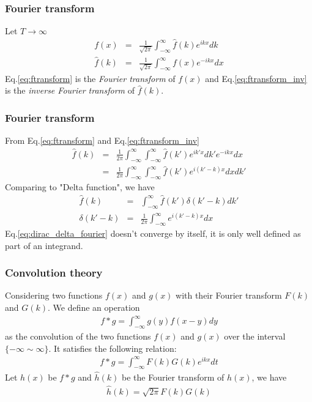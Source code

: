\documentclass{beamer}
\begin{document}
\begin{frame}
\frametitle{Fourier transform}
Let $T\longrightarrow\infty$
\begin{eqnarray}
f(x)&=&\frac{1}{\sqrt{2\pi}}\int_{-\infty}^{\infty} \hat{f}(k) e^{ikx} dk
\label{eq:ftransform_inv}\\
\hat{f}(k)&=&\frac{1}{\sqrt{2\pi}}\int_{-\infty}^{\infty} f(x) e^{-ikx} dx
\label{eq:ftransform}
\end{eqnarray}
Eq.\ref{eq:ftransform} is the \emph{Fourier transform} of $f(x)$ and Eq.\ref{eq:ftransform_inv} is the \emph{inverse Fourier transform} of $\hat{f}(k)$.
\end{frame}
\begin{frame}
\frametitle{Fourier transform}
From Eq.\ref{eq:ftransform} and Eq.\ref{eq:ftransform_inv}
\begin{eqnarray}
\hat{f}(k)&=&\frac{1}{2\pi}\int_{-\infty}^{\infty} \int_{-\infty}^{\infty} \hat{f}(k') e^{ik'x} dk' e^{-ikx} dx \nonumber \\
          &=&\frac{1}{2\pi}\int_{-\infty}^{\infty} \int_{-\infty}^{\infty} \hat{f}(k') e^{i(k'-k)x} dx dk' \nonumber
\end{eqnarray}
Comparing to "Delta function", we have
\begin{eqnarray}
\hat{f}(k)&=&\int_{-\infty}^{\infty} \hat{f}(k') \delta{(k'- k)} dk' \nonumber \\
\delta{(k'- k)} &=& \frac{1}{2\pi}\int_{-\infty}^{\infty} e^{i(k'-k)x} dx
\label{eq:dirac_delta_fourier}
\end{eqnarray}
Eq.\ref{eq:dirac_delta_fourier} doesn't converge by itself, it is only well defined as part of an integrand.
\end{frame}
\begin{frame}
\frametitle{Convolution theory}
Considering two functions $f(x)$ and $g(x)$ with their Fourier transform $F(k)$ and $G(k)$. We define an operation
\begin{eqnarray}
f\ast g = \int_{-\infty}^{\infty}g(y)f(x-y)dy
\label{eq:convolution}
\end{eqnarray}
as the convolution of the two functions $f(x)$ and $g(x)$ over the interval $\{ -\infty \sim \infty \}$. It satisfies the following relation:
\begin{eqnarray}
f \ast g = \int_{-\infty}^{\infty}F(k)G(k) e^{ikx}dt
\label{eq:convolution_theorem}
\end{eqnarray}
Let $h(x)$ be $f \ast g$ and $\hat{h}(k)$ be the Fourier transform of $h(x)$, we have
\begin{eqnarray}
\hat{h}(k) = \sqrt{2\pi}F(k)G(k)
\label{eq:convolution_theorem2}
\end{eqnarray}
\end{frame}
\end{document}
